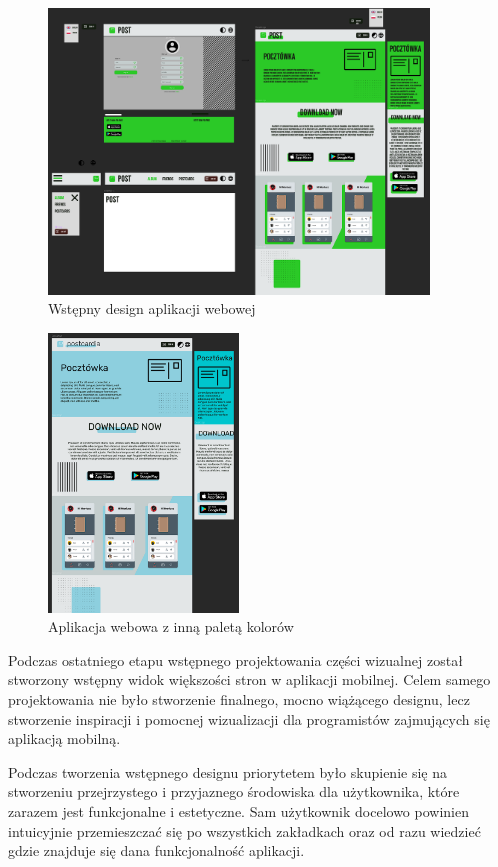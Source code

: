 \documentclass[a4paper,twoside,12pt]{book}
\begin{document}
\begin{figure}[H]
    \centering
    \includegraphics[width=0.9\textwidth]{wizje_ss/figma-web-green.png}
    \caption{Wstępny design aplikacji webowej}
\end{figure}
\begin{figure}[H]
    \centering
    \includegraphics[width=0.45\textwidth]{wizje_ss/figma-web-blue.png}
    \caption{Aplikacja webowa z inną paletą kolorów}
\end{figure}
\newpage

Podczas ostatniego etapu wstępnego projektowania części wizualnej został stworzony wstępny widok większości stron w aplikacji mobilnej. Celem samego projektowania nie było stworzenie finalnego, mocno wiążącego designu, lecz stworzenie inspiracji i pomocnej wizualizacji dla programistów zajmujących się aplikacją mobilną.

Podczas tworzenia wstępnego designu priorytetem było skupienie się na stworzeniu przejrzystego i przyjaznego środowiska dla użytkownika, które zarazem jest funkcjonalne i estetyczne. Sam użytkownik docelowo powinien intuicyjnie przemieszczać się po wszystkich zakładkach oraz od razu wiedzieć gdzie znajduje się dana funkcjonalność aplikacji.
\end{document}
